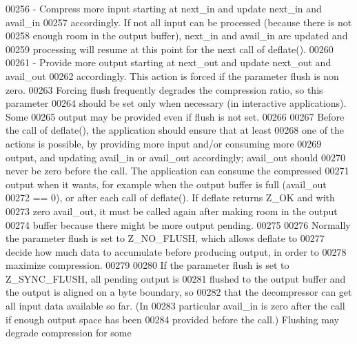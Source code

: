 \begin{DoxyCode}
00256 \textcolor{comment}{  - Compress more input starting at next\_in and update next\_in and avail\_in}
00257 \textcolor{comment}{    accordingly.  If not all input can be processed (because there is not}
00258 \textcolor{comment}{    enough room in the output buffer), next\_in and avail\_in are updated and}
00259 \textcolor{comment}{    processing will resume at this point for the next call of deflate().}
00260 \textcolor{comment}{}
00261 \textcolor{comment}{  - Provide more output starting at next\_out and update next\_out and avail\_out}
00262 \textcolor{comment}{    accordingly.  This action is forced if the parameter flush is non zero.}
00263 \textcolor{comment}{    Forcing flush frequently degrades the compression ratio, so this parameter}
00264 \textcolor{comment}{    should be set only when necessary (in interactive applications).  Some}
00265 \textcolor{comment}{    output may be provided even if flush is not set.}
00266 \textcolor{comment}{}
00267 \textcolor{comment}{    Before the call of deflate(), the application should ensure that at least}
00268 \textcolor{comment}{  one of the actions is possible, by providing more input and/or consuming more}
00269 \textcolor{comment}{  output, and updating avail\_in or avail\_out accordingly; avail\_out should}
00270 \textcolor{comment}{  never be zero before the call.  The application can consume the compressed}
00271 \textcolor{comment}{  output when it wants, for example when the output buffer is full (avail\_out}
00272 \textcolor{comment}{  == 0), or after each call of deflate().  If deflate returns Z\_OK and with}
00273 \textcolor{comment}{  zero avail\_out, it must be called again after making room in the output}
00274 \textcolor{comment}{  buffer because there might be more output pending.}
00275 \textcolor{comment}{}
00276 \textcolor{comment}{    Normally the parameter flush is set to Z\_NO\_FLUSH, which allows deflate to}
00277 \textcolor{comment}{  decide how much data to accumulate before producing output, in order to}
00278 \textcolor{comment}{  maximize compression.}
00279 \textcolor{comment}{}
00280 \textcolor{comment}{    If the parameter flush is set to Z\_SYNC\_FLUSH, all pending output is}
00281 \textcolor{comment}{  flushed to the output buffer and the output is aligned on a byte boundary, so}
00282 \textcolor{comment}{  that the decompressor can get all input data available so far.  (In}
00283 \textcolor{comment}{  particular avail\_in is zero after the call if enough output space has been}
00284 \textcolor{comment}{  provided before the call.) Flushing may degrade compression for some}

\end{DoxyCode}
